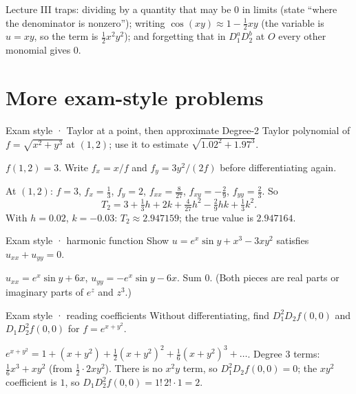 \begin{trap}
Lecture III traps: dividing by a quantity that may be $0$ in limits (state ``where the
denominator is nonzero''); writing $\cos(xy)\approx1-\tfrac12xy$ (the variable is $u=xy$, so
the term is $\tfrac12x^2y^2$); and forgetting that in $D_1^aD_2^b$ at $O$ every other monomial
gives $0$.
\end{trap}

\section{More exam-style problems}

\begin{problem}{Exam style · Taylor at a point, then approximate}
Degree-2 Taylor polynomial of $f=\sqrt{x^2+y^3}$ at $(1,2)$; use it to estimate $\sqrt{1.02^2+1.97^3}$.
\end{problem}
\begin{hint}$f(1,2)=3$. Write $f_x=x/f$ and $f_y=3y^2/(2f)$ before differentiating again.\end{hint}
\begin{solution}
At $(1,2)$: $f=3$, $f_x=\tfrac13$, $f_y=2$, $f_{xx}=\tfrac8{27}$, $f_{xy}=-\tfrac29$, $f_{yy}=\tfrac23$. So
\[ T_2=3+\tfrac13h+2k+\tfrac4{27}h^2-\tfrac29hk+\tfrac13k^2. \]
With $h=0.02$, $k=-0.03$: $T_2\approx2.947159$; the true value is $2.947164$.
\end{solution}

\begin{problem}{Exam style · harmonic function}
Show $u=e^x\sin y+x^3-3xy^2$ satisfies $u_{xx}+u_{yy}=0$.
\end{problem}
\begin{solution}
$u_{xx}=e^x\sin y+6x$, $u_{yy}=-e^x\sin y-6x$. Sum $0$. (Both pieces are real parts or imaginary
parts of $e^{z}$ and $z^3$.)
\end{solution}

\begin{problem}{Exam style · reading coefficients}
Without differentiating, find $D_1^2D_2f(0,0)$ and $D_1D_2^2f(0,0)$ for $f=e^{x+y^2}$.
\end{problem}
\begin{solution}
$e^{x+y^2}=1+(x+y^2)+\tfrac12(x+y^2)^2+\tfrac16(x+y^2)^3+\dots$. Degree 3 terms: $\tfrac16x^3+xy^2$ (from
$\tfrac12\cdot2xy^2$). There is no $x^2y$ term, so $D_1^2D_2f(0,0)=0$; the $xy^2$ coefficient is $1$, so
$D_1D_2^2f(0,0)=1!\,2!\cdot1=2$.
\end{solution}

